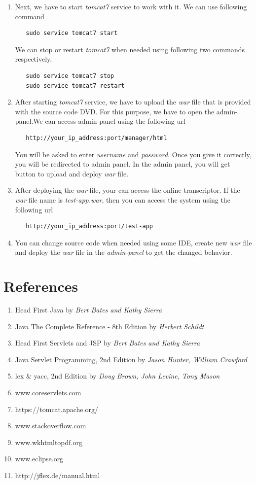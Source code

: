 \documentclass[12pt,oneside,openany,a4paper]{book}
\begin{document}
\begin{appendices}
\begin{enumerate}[label=\roman*)]
\item{Next, we have to start \emph{tomcat7} service to work with it. We can use following command
\begin{lstlisting}
   sudo service tomcat7 start
\end{lstlisting} 
We can stop or restart \emph{tomcat7} when needed using following two commands respectively.
\begin{lstlisting}
   sudo service tomcat7 stop
   sudo service tomcat7 restart
\end{lstlisting}
}
\item{
After starting \emph{tomcat7} service, we have to upload the \emph{war} file that is provided with the source code DVD. For this purpose, we have to open the admin-panel.We can access admin panel using the following url 
\begin{lstlisting}
   http://your_ip_address:port/manager/html
\end{lstlisting}
You will be asked to enter \emph{username} and \emph{password}. Once you give it correctly, you will be redirected to admin panel. In the admin panel, you will get button to upload and deploy \emph{war} file.
}
\item{
After deploying the \emph{war} file, your can access the online transcriptor. If the \emph{war} file name is \emph{test-app.war}, then you can access the system using the following url 
\begin{lstlisting}
   http://your_ip_address:port/test-app
\end{lstlisting}
}
\item{You can change source code when needed using some IDE, create new \emph{war} file and deploy the \emph{war} file in the \emph{admin-panel} to get the changed behavior.}

\end{enumerate}

\chapter{References}
\begin{enumerate}
\item{Head First Java by \emph{Bert Bates and Kathy Sierra}}
\item{Java The Complete Reference - 8th Edition by \emph{Herbert Schildt}}
\item{Head First Servlets and JSP by \emph{Bert Bates and Kathy Sierra}}
\item{Java Servlet Programming, 2nd Edition by \emph{Jason Hunter, William Crawford}}
\item{lex \& yacc, 2nd Edition by \emph{Doug Brown, John Levine, Tony Mason}}
\item{www.coreservlets.com}
\item{https://tomcat.apache.org/}
\item{www.stackoverflow.com}
\item{www.wkhtmltopdf.org}
\item{www.eclipse.org}
\item{http://jflex.de/manual.html}
\end{enumerate}


\end{appendices}
\end{document}
